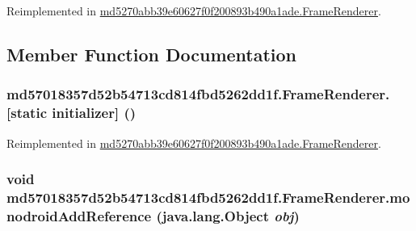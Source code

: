 Reimplemented in \hyperlink{classmd5270abb39e60627f0f200893b490a1ade_1_1_frame_renderer_543d9dca2ecf03f07b3939703cdb19eb}{md5270abb39e60627f0f200893b490a1ade.FrameRenderer}.

\subsection{Member Function Documentation}
\hypertarget{classmd57018357d52b54713cd814fbd5262dd1f_1_1_frame_renderer_a810e33e4b7da21f778c64ab4be4d92d}{
\subsubsection[{[static initializer]}]{\setlength{\rightskip}{0pt plus 5cm}md57018357d52b54713cd814fbd5262dd1f.FrameRenderer.\mbox{[}static initializer\mbox{]} ()}}
\label{classmd57018357d52b54713cd814fbd5262dd1f_1_1_frame_renderer_a810e33e4b7da21f778c64ab4be4d92d}




Reimplemented in \hyperlink{classmd5270abb39e60627f0f200893b490a1ade_1_1_frame_renderer_7c5c8e5bc02ee23d24e2a5e6ffe3392e}{md5270abb39e60627f0f200893b490a1ade.FrameRenderer}.\hypertarget{classmd57018357d52b54713cd814fbd5262dd1f_1_1_frame_renderer_14f0719110866c6f4a0475fbfc1ce2ad}{
\subsubsection[{monodroidAddReference}]{\setlength{\rightskip}{0pt plus 5cm}void md57018357d52b54713cd814fbd5262dd1f.FrameRenderer.monodroidAddReference (java.lang.Object {\em obj})}}
\label{classmd57018357d52b54713cd814fbd5262dd1f_1_1_frame_renderer_14f0719110866c6f4a0475fbfc1ce2ad}




